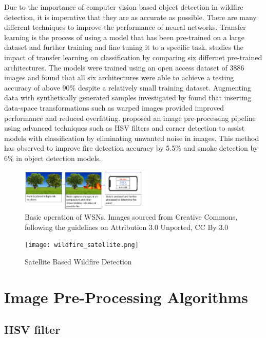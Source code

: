 \documentclass[lettersize,journal]{IEEEtran}
\begin{document}
Due to the importance of computer vision based object detection in
wildfire detection, it is imperative that they are as accurate as
possible. There are many different techniques to improve the performance
of neural networks. Transfer learning is the process of using a model
that has been pre-trained on a large dataset and further training and
fine tuning it to a specific task. \cite{transferlearning} studies the
impact of transfer learning on classification by comparing six differnet
pre-trained architectures. The models were trained using an open access
dataset of 3886 images and found that all six architectures were able to
achieve a testing accuracy of above 90\% despite a relatively small
training dataset. Augmenting data with synthetically generated samples
investigated by \cite{augment} found that inserting data-space
transformations such as warped images provided improved performance and
reduced overfitting. \cite{prepfire} proposed an image pre-processing
pipeline using advanced techniques such as HSV filters and corner
detection to assist models with classification by eliminating unwanted
noise in images. This method has observed to improve fire detection
accuracy by 5.5\% and smoke detection by 6\% in object detection models.

\begin{figure}
        \centering
        \includegraphics[width=2.5in]{sensornode.png}
        \caption{Basic operation of WSNs. Images sourced from Creative Commons,
        following the guidelines on Attribution 3.0 Unported, CC By 3.0}
\end{figure}

\begin{figure}
        \centering
        \texttt{[image: wildfire\_satellite.png]}
        \caption{Satellite Based Wildfire Detection}
\end{figure}

\section{Image Pre-Processing Algorithms}

\subsection{HSV filter}
\end{document}
